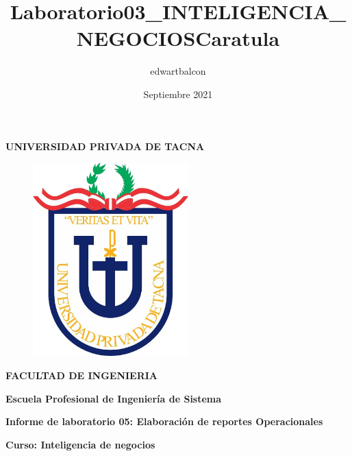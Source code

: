 \documentclass{article}
\title{Laboratorio03_INTELIGENCIA_NEGOCIOS}
\author{edwartbalcon}
\date{Septiembre 2021}
\begin{document}
\title{Caratula}

\begin{titlepage}
\begin{center}
\begin{Large}
\textbf{UNIVERSIDAD PRIVADA DE TACNA} \\
\end{Large}
\vspace*{-0.025in}
\begin{figure}[htb]
\begin{center}
\includegraphics[width=6cm]{./images/logo_UPT}
\end{center}
\end{figure}
\vspace*{-0.025in}
\begin{Large}
\textbf{FACULTAD DE INGENIERIA} \\
\end{Large}
\vspace*{0.05in}
\begin{Large}
\textbf{Escuela Profesional de Ingeniería de Sistema} \\
\end{Large}


\vspace*{0.4in}

\vspace*{0.1in}
\begin{Large}
\textbf{Informe de laboratorio 05: Elaboración de reportes Operacionales} \\
\end{Large}

\vspace*{0.3in}
\begin{Large}
\textbf{Curso: Inteligencia de negocios} \\
\end{Large}


\end{center}
\end{titlepage}
\end{document}
